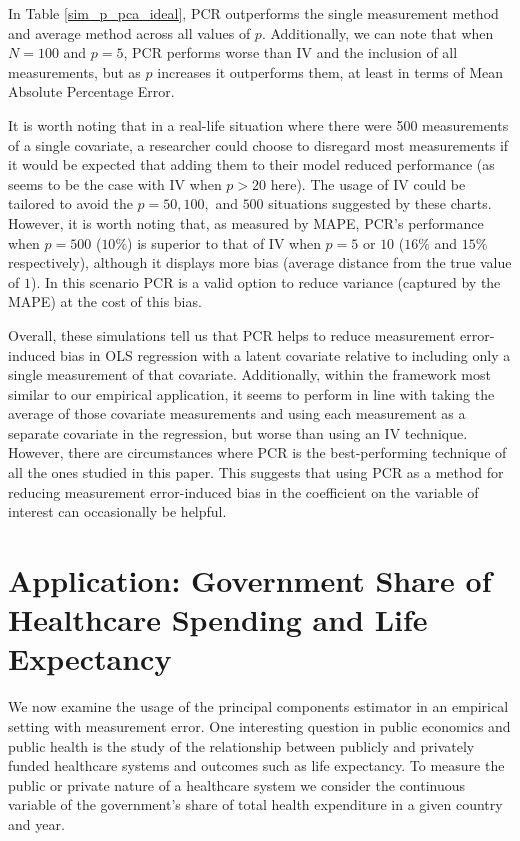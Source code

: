 \documentclass[10pt]{article}
\begin{document}
        In Table \ref{sim_p_pca_ideal}, PCR outperforms the single measurement method and average method across all values of $p$. Additionally, we can note that when $N=100$ and $p=5$, PCR performs worse than IV and the inclusion of all measurements, but as $p$ increases it outperforms them, at least in terms of Mean Absolute Percentage Error. 

        It is worth noting that in a real-life situation where there were 500 measurements of a single covariate, a researcher could choose to disregard most measurements if it would be expected that adding them to their model reduced performance (as seems to be the case with IV when $p>20$ here). The usage of IV could be tailored to avoid the $p=50,100,$ and $500$ situations suggested by these charts. However, it is worth noting that, as measured by MAPE, PCR's performance when $p=500$ ($10\%$) is superior to that of IV when $p=5$ or $10$ ($16\%$ and $15\%$ respectively), although it displays more bias (average distance from the true value of $1$). In this scenario PCR is a valid option to reduce variance (captured by the MAPE) at the cost of this bias.

        Overall, these simulations tell us that PCR helps to reduce measurement error-induced bias in OLS regression with a latent covariate relative to including only a single measurement of that covariate. Additionally, within the framework most similar to our empirical application, it seems to perform in line with taking the average of those covariate measurements and using each measurement as a separate covariate in the regression, but worse than using an IV technique. However, there are circumstances where PCR is the best-performing technique of all the ones studied in this paper. This suggests that using PCR as a method for reducing measurement error-induced bias in the coefficient on the variable of interest can occasionally be helpful.

    \section*{Application: Government Share of Healthcare Spending and Life Expectancy}

        We now examine the usage of the principal components estimator in an empirical setting with measurement error. One interesting question in public economics and public health is the study of the relationship between publicly and privately funded healthcare systems and outcomes such as life expectancy. To measure the public or private nature of a healthcare system we consider the continuous variable of the government's share of total health expenditure in a given country and year.
\end{document}
